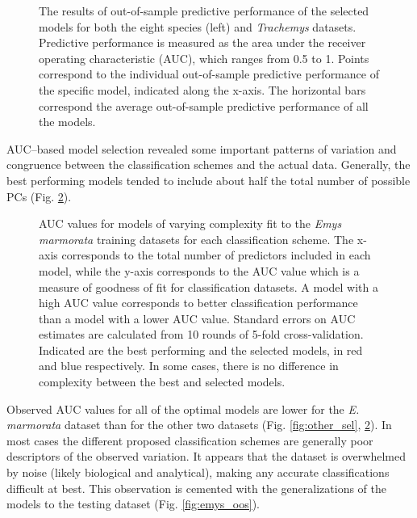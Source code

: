 \documentclass[10pt,letterpaper]{article}
\begin{document}
\begin{figure}[h]
  \centering
  \caption{The results of out-of-sample predictive performance of the selected models for both the eight species (left) and \textit{Trachemys} datasets. Predictive performance is measured as the area under the receiver operating characteristic (AUC), which ranges from 0.5 to 1. Points correspond to the individual out-of-sample predictive performance of the specific model, indicated along the x-axis. The horizontal bars correspond the average out-of-sample predictive performance of all the models.}
  \label{fig:other_oos}
\end{figure}


AUC--based model selection revealed some important patterns of variation and congruence between the classification schemes and the actual data. Generally, the best performing models tended to include about half the total number of possible PCs (Fig. \ref{fig:emys_sel}). 

\begin{figure}[ht]
  \centering
  \caption{AUC values for models of varying complexity fit to the \textit{Emys marmorata} training datasets for each classification scheme. The x-axis corresponds to the total number of predictors included in each model, while the y-axis corresponds to the AUC value which is a measure of goodness of fit for classification datasets. A model with a high AUC value corresponds to better classification performance than a model with a lower AUC value. Standard errors on AUC estimates are calculated from 10 rounds of 5-fold cross-validation. Indicated are the best performing and the selected models, in red and blue respectively. In some cases, there is no difference in complexity between the best and selected models.}
  \label{fig:emys_sel}
\end{figure}

Observed AUC values for all of the optimal models are lower for the \textit{E. marmorata} dataset than for the other two datasets (Fig. \ref{fig:other_sel}, \ref{fig:emys_sel}). In most cases the different proposed classification schemes are generally poor descriptors of the observed variation. It appears that the dataset is overwhelmed by noise (likely biological and analytical), making any accurate classifications difficult at best. This observation is cemented with the generalizations of the models to the testing dataset (Fig. \ref{fig:emys_oos}).
\end{document}
